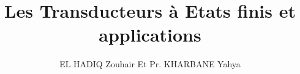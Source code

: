 \author{EL HADIQ Zouhair Et Pr. KHARBANE Yahya }
\title{Les Transducteurs à Etats finis et applications}


\usepackage[left=3cm,right=3cm,top=2cm,bottom=3cm]{geometry}

\usepackage[french]{babel}
\usepackage[utf8]{inputenc}
\usepackage[left=3cm,right=3cm,top=2cm,bottom=3cm]{geometry}
\usepackage{makeidx}
\usepackage[T1]{fontenc}
\usepackage{amsmath}
\usepackage{epsfig}
\usepackage{amssymb,amscd,amsthm,verbatim}
\usepackage{lmodern}
\usepackage{tikz}
\usetikzlibrary{automata, positioning, arrows}


\newtheorem{definition}{Définition}[section]
\newtheorem{proposition}{Proposition}[section]
\newtheorem{theoreme}{Théorème}[section]
\newtheorem{coro}{Corollaire}[section]
\newtheorem{lemme}{Lemme}[section]

